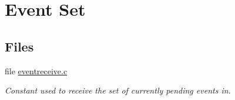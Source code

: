 \hypertarget{group__ClassicEventSet}{}\section{Event Set}
\label{group__ClassicEventSet}
\subsection*{Files}
\begin{DoxyCompactItemize}
\item 
file \mbox{\hyperlink{eventreceive_8c}{eventreceive.\+c}}
\begin{DoxyCompactList}\small\item\em Constant used to receive the set of currently pending events in. \end{DoxyCompactList}\end{DoxyCompactItemize}
